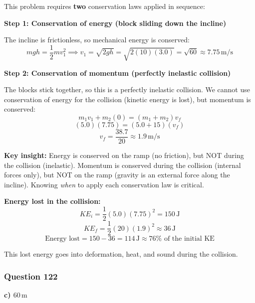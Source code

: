 \documentclass[12pt,letterpaper]{article}
\begin{document}
\begin{explanationbox}
This problem requires \textbf{two} conservation laws applied in sequence:

\textbf{Step 1: Conservation of energy (block sliding down the incline)}

The incline is frictionless, so mechanical energy is conserved:
\[
mgh = \frac{1}{2}mv_1^2 \implies v_1 = \sqrt{2gh} = \sqrt{2(10)(3.0)} = \sqrt{60} \approx 7.75\,\text{m/s}
\]

\textbf{Step 2: Conservation of momentum (perfectly inelastic collision)}

The blocks stick together, so this is a perfectly inelastic collision. We cannot use conservation of energy for the collision (kinetic energy is lost), but momentum is conserved:
\[
m_1 v_1 + m_2(0) = (m_1 + m_2)v_f
\]
\[
(5.0)(7.75) = (5.0 + 15)(v_f)
\]
\[
v_f = \frac{38.7}{20} \approx 1.9\,\text{m/s}
\]

\textbf{Key insight:} Energy is conserved on the ramp (no friction), but NOT during the collision (inelastic). Momentum is conserved during the collision (internal forces only), but NOT on the ramp (gravity is an external force along the incline). Knowing \emph{when} to apply each conservation law is critical.

\textbf{Energy lost in the collision:}
\[
KE_i = \frac{1}{2}(5.0)(7.75)^2 = 150\,\text{J}
\]
\[
KE_f = \frac{1}{2}(20)(1.9)^2 \approx 36\,\text{J}
\]
\[
\text{Energy lost} = 150 - 36 = 114\,\text{J} \approx 76\%\text{ of the initial KE}
\]

This lost energy goes into deformation, heat, and sound during the collision.
\end{explanationbox}

\subsubsection*{Question 122}

\begin{answerbox}
\textbf{c) $60\,\text{m}$}
\end{answerbox}
\end{document}

